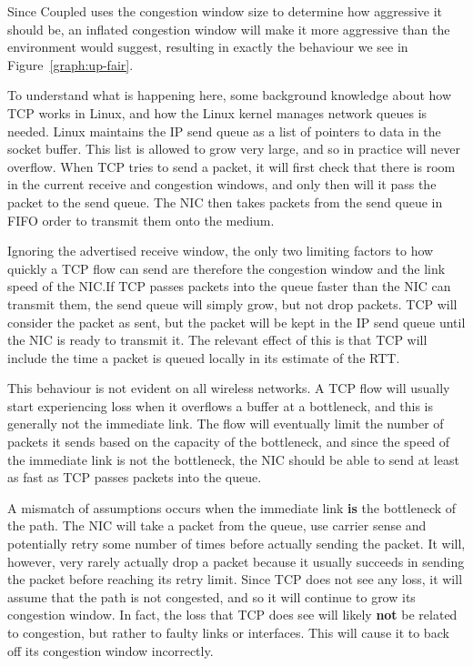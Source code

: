 Since Coupled uses the congestion window size to determine how aggressive it
should be, an inflated congestion window will make it more aggressive than the 
environment would suggest, resulting in exactly the behaviour we see in
Figure~\ref{graph:up-fair}.

To understand what is happening here, some background knowledge about how TCP
works in Linux, and how the Linux kernel manages network queues is needed. Linux
maintains the IP send queue as a list of pointers to data in the socket buffer. 
This list is allowed to grow very large, and so in practice will never overflow.
When TCP tries to send a packet, it will first check that there is room in
the current receive and congestion windows, and only then will it pass the packet to the
send queue. The NIC then takes packets  from the send queue in FIFO order to
transmit them onto the medium.

Ignoring the advertised receive window, the only two limiting factors to how
quickly a TCP flow
can send are therefore the congestion window and the link speed of the NIC.\@ If
TCP passes packets into the queue faster than the NIC can transmit them, the
send queue will simply grow, but not drop packets. TCP will consider the
packet as sent, but the packet will be kept in the IP send queue until
the NIC is ready to transmit it. The relevant effect of this is that TCP will
include the time a packet is queued locally in its estimate of the RTT.

This behaviour is not evident on all wireless networks. A TCP flow
will usually start experiencing loss when it overflows a
buffer at a bottleneck, and this is generally not the immediate link.
The flow will eventually limit the number of packets it sends based on the
capacity of the bottleneck, and since the speed of the immediate link is not
the bottleneck, the NIC should be able to send at least as fast as TCP passes
packets into the queue.

A mismatch of assumptions occurs when the immediate link \textbf{is} the 
bottleneck of the path. The NIC will take a packet from the queue, use carrier 
sense and potentially retry some number of times before actually sending the 
packet. It will, however, very rarely actually drop a packet because it usually 
succeeds in sending the packet before reaching its retry limit. Since TCP does 
not see any loss, it will assume that the path is not congested, and so it will 
continue to grow its congestion window.  In fact, the loss that TCP does see 
will likely \textbf{not} be related to congestion, but rather to faulty links or interfaces.
This will cause it to back off its congestion window incorrectly.

